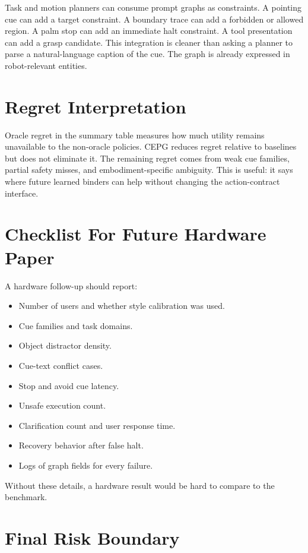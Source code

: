 \documentclass{article}
\newcommand{\method}{CEPG}
\begin{document}
Task and motion planners can consume prompt graphs as constraints. A pointing cue can add a target constraint. A boundary trace can add a forbidden or allowed region. A palm stop can add an immediate halt constraint. A tool presentation can add a grasp candidate. This integration is cleaner than asking a planner to parse a natural-language caption of the cue. The graph is already expressed in robot-relevant entities.

\section{Regret Interpretation}

Oracle regret in the summary table measures how much utility remains unavailable to the non-oracle policies. \method{} reduces regret relative to baselines but does not eliminate it. The remaining regret comes from weak cue families, partial safety misses, and embodiment-specific ambiguity. This is useful: it says where future learned binders can help without changing the action-contract interface.

\section{Checklist For Future Hardware Paper}

A hardware follow-up should report:
\begin{itemize}
\item Number of users and whether style calibration was used.
\item Cue families and task domains.
\item Object distractor density.
\item Cue-text conflict cases.
\item Stop and avoid cue latency.
\item Unsafe execution count.
\item Clarification count and user response time.
\item Recovery behavior after false halt.
\item Logs of graph fields for every failure.
\end{itemize}
Without these details, a hardware result would be hard to compare to the benchmark.

\section{Final Risk Boundary}
\end{document}
